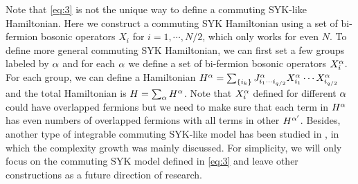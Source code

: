 \documentclass[11pt]{article}
\renewcommand{\>}{\rangle}
\newcommand{\<}{\langle}
\begin{document}
Note that \eqref{eq:3} is not the unique way to define a commuting SYK-like Hamiltonian. Here we construct a commuting SYK Hamiltonian using a set
of bi-fermion bosonic operators $X_{i}$ for $i=1,\cdots,N/2$, which only works for even $N$. To define more general
commuting SYK Hamiltonian, we can first set a few groups labeled by
$\alpha$ and for each $\alpha$ we define a set of bi-fermion bosonic
operators $X_{i}^{\alpha}$. For each group, we can define a Hamiltonian
$H^{\alpha}=\sum_{\{i_{k}\}}J_{i_{1}\cdots i_{q/2}}^{\alpha}X_{i_{1}}^{\alpha}\cdots X_{i_{q/2}}^{\alpha}$
and the total Hamiltonian is $H=\sum_{\alpha}H^{\alpha}$. Note that $X_{i}^{\alpha}$
defined for different $\alpha$ could have overlapped fermions but we
need to make sure that each term in $H^{\alpha}$ has even numbers of
overlapped fermions with all terms in other $H^{\alpha'}$. Besides, another type of integrable commuting SYK-like model has been studied in \cite{Balasubramanian:2021mxo,Craps:2022ese}, in which the complexity growth was mainly discussed. For simplicity, we will only focus on the commuting SYK model defined in \eqref{eq:3} and leave other constructions as a future direction of research.
\end{document}
